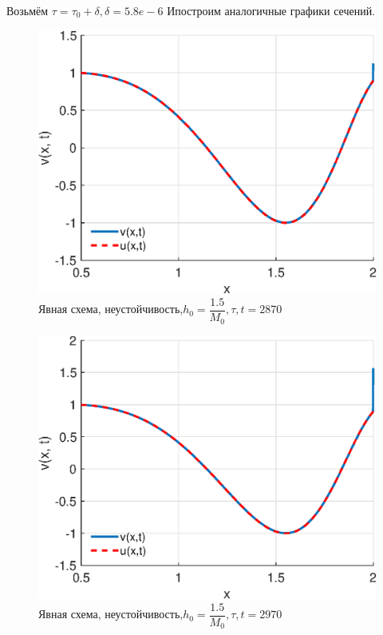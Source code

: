 \documentclass[12pt]{article}
\begin{document}
\begin{enumerate}
Возьмём $\tau = \tau_0 + \delta, \delta = 5.8e-6$ Ипостроим аналогичные графики сечений.

\begin{figure}[H]
\centerline{\includegraphics[scale = 0.7]{exp_d_t=2870.eps}}
\caption{Явная схема, неустойчивость,$h_0 = \dfrac{1.5}{M_0}, \tau, t = 2870$}
\end{figure} 

\begin{figure}[H]
\centerline{\includegraphics[scale = 0.7]{exp_d_t=2970.eps}}
\caption{Явная схема, неустойчивость,$h_0 = \dfrac{1.5}{M_0}, \tau, t = 2970$}
\end{figure} 


\end{enumerate}
\end{document}

